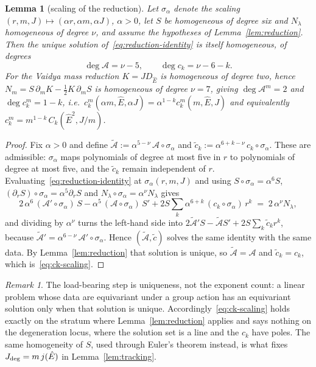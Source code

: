 \documentclass[12pt]{iopart}
\newcommand{\Ehat}{\hat E}
\newcommand{\Jc}{J_{\rm deg}}
\theoremstyle{plain}
\theoremstyle{definition}
\theoremstyle{plain}
\newtheorem{auxlemma}{Lemma}
\theoremstyle{remark}
\newtheorem*{remark}{Remark}
\begin{document}
\begin{auxlemma}[scaling of the reduction]\label{lem:ck-scaling}
Let $\sigma_\alpha$ denote the scaling $(r,m,J)\mapsto(\alpha r,\alpha m,\alpha J)$,
$\alpha>0$, let $S$ be homogeneous of degree six and $N_\lambda$ homogeneous of degree
$\nu$, and assume the hypotheses of Lemma~\ref{lem:reduction}. Then the unique solution
of~\eqref{eq:reduction-identity} is itself homogeneous, of degrees
\begin{equation}
   \deg\mathcal{A}=\nu-5,\qquad \deg c_k=\nu-6-k .
   \label{eq:ck-scaling}
\end{equation}
For the Vaidya mass reduction $K=JD_{\Ehat}$ is homogeneous of degree \emph{two}, hence
$N_m=S\,\partial_mK-\tfrac12K\,\partial_mS$ is homogeneous of degree $\nu=7$, giving
$\deg\mathcal{A}^m=2$ and $\deg c^m_k=1-k$, i.e.\
$c^m_k(\alpha m,\Ehat,\alpha J)=\alpha^{1-k}c^m_k(m,\Ehat,J)$ and equivalently
$c^m_k=m^{1-k}\,C_k(\Ehat^2,J/m)$.
\end{auxlemma}

\begin{proof}
Fix $\alpha>0$ and define
$\tilde{\mathcal{A}}:=\alpha^{5-\nu}\,\mathcal{A}\!\circ\!\sigma_\alpha$ and
$\tilde c_k:=\alpha^{6+k-\nu}\,c_k\!\circ\!\sigma_\alpha$. These are admissible: $\sigma_\alpha$
maps polynomials of degree at most five in $r$ to polynomials of degree at most five, and
the $\tilde c_k$ remain independent of $r$. Evaluating~\eqref{eq:reduction-identity} at
$\sigma_\alpha(r,m,J)$ and using $S\circ\sigma_\alpha=\alpha^6S$,
$(\partial_rS)\circ\sigma_\alpha=\alpha^5\partial_rS$ and
$N_\lambda\circ\sigma_\alpha=\alpha^\nu N_\lambda$ gives
\[
   2\,\alpha^{6}\,(\mathcal{A}'\!\circ\!\sigma_\alpha)\,S
   -\alpha^{5}\,(\mathcal{A}\circ\sigma_\alpha)\,S'
   +2S\sum_k\alpha^{6+k}\,(c_k\circ\sigma_\alpha)\,r^k
   \;=\;2\,\alpha^{\nu}N_\lambda ,
\]
and dividing by $\alpha^{\nu}$ turns the left-hand side into
$2\tilde{\mathcal{A}}'S-\tilde{\mathcal{A}}S'+2S\sum_k\tilde c_kr^k$, because
$\tilde{\mathcal{A}}'=\alpha^{6-\nu}\,\mathcal{A}'\!\circ\!\sigma_\alpha$. Hence
$(\tilde{\mathcal{A}},\tilde c)$ solves the same identity with the same data. By
Lemma~\ref{lem:reduction} that solution is unique, so
$\tilde{\mathcal{A}}=\mathcal{A}$ and $\tilde c_k=c_k$, which is~\eqref{eq:ck-scaling}.
\end{proof}

\begin{remark}
The load-bearing step is uniqueness, not the exponent count: a linear problem whose data
are equivariant under a group action has an equivariant solution only when that solution
is unique. Accordingly~\eqref{eq:ck-scaling} holds exactly on the stratum where
Lemma~\ref{lem:reduction} applies and says nothing on the degeneration locus, where the
solution set is a line and the $c_k$ have poles. The same homogeneity of $S$, used through
Euler's theorem instead, is what fixes $\Jc=m\,j(\Ehat)$ in Lemma~\ref{lem:tracking}.
\end{remark}
\end{document}
